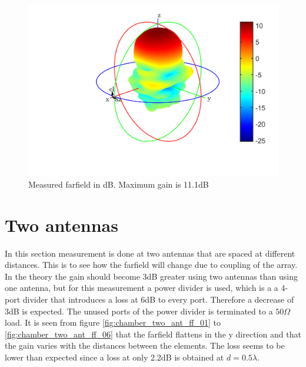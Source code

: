 \begin{figure}[H]
\centering 
\includegraphics[scale = 0.8]{figures/measurement/antennas/one_ant.png}
\caption{Measured farfield in dB. Maximum gain is 11.1dB}
\label{fig:chamber_one_ant_ff}
\end{figure} 

\section{Two antennas}
In this section measurement is done at two antennas that are spaced at different distances. This is to see how the farfield will change due to coupling of the array. In the theory the gain should become 3dB greater using two antennas than using one antenna, but for this measurement a power divider is used, which is a a 4-port divider that introduces a loss at 6dB to every port. Therefore a decrease of 3dB is expected. The unused ports of the power divider is terminated to a $50\Omega$ load. It is seen from figure \ref{fig:chamber_two_ant_ff_01} to \ref{fig:chamber_two_ant_ff_06} that the farfield flattens in the y direction and that the gain varies with the distances between the elements. The loss seems to be lower than expected since a loss at only 2.2dB is obtained at $d=0.5\lambda$.

